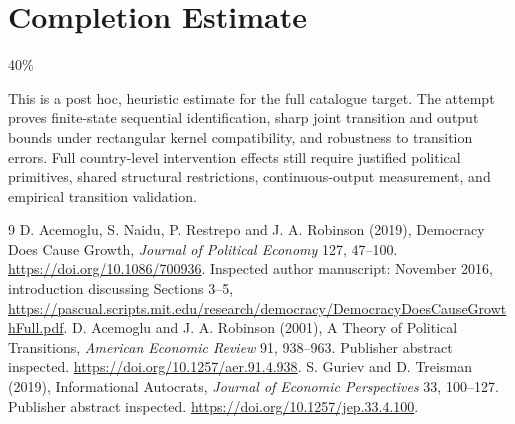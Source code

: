 \documentclass[11pt]{article}
\begin{document}
\section{Completion Estimate}
40\%

This is a post hoc, heuristic estimate for the full catalogue target.
The attempt proves finite-state sequential identification, sharp joint transition and output bounds under rectangular kernel compatibility, and robustness to transition errors. Full country-level intervention effects still require justified political primitives, shared structural restrictions, continuous-output measurement, and empirical transition validation.

\begin{thebibliography}{9}
 D. Acemoglu, S. Naidu, P. Restrepo and J. A. Robinson (2019),
Democracy Does Cause Growth, \emph{Journal of Political Economy} 127,
47--100. \url{https://doi.org/10.1086/700936}.
Inspected author manuscript: November 2016, introduction discussing Sections
3--5, \url{https://pascual.scripts.mit.edu/research/democracy/DemocracyDoesCauseGrowthFull.pdf}.
 D. Acemoglu and J. A. Robinson (2001), A Theory of Political
Transitions, \emph{American Economic Review} 91, 938--963. Publisher
abstract inspected. \url{https://doi.org/10.1257/aer.91.4.938}.
 S. Guriev and D. Treisman (2019), Informational Autocrats,
\emph{Journal of Economic Perspectives} 33, 100--127. Publisher abstract
inspected. \url{https://doi.org/10.1257/jep.33.4.100}.
\end{thebibliography}
\end{document}
